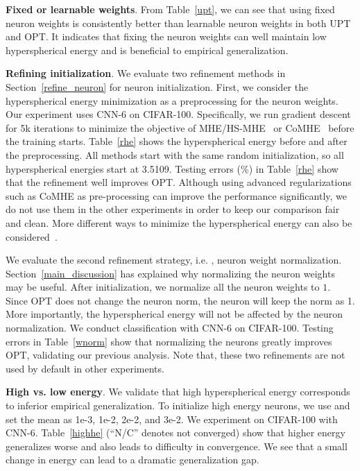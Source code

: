 \textbf{Fixed or learnable weights}. From Table~\ref{upt}, we can see that using fixed neuron weights is consistently better than learnable neuron weights in both UPT and OPT. It indicates that fixing the neuron weights can well maintain low hyperspherical energy and is beneficial to empirical generalization.

\textbf{Refining initialization}. We evaluate two refinement methods in Section~\ref{refine_neuron} for neuron initialization. First, we consider the hyperspherical energy minimization as a preprocessing for the neuron weights. Our experiment uses CNN-6 on CIFAR-100. Specifically, we run gradient descent for 5k iterations to minimize the objective of MHE/HS-MHE~\cite{liu2018learning} or CoMHE~\cite{LinCoMHE20} before the training starts. Table~\ref{rhe} shows the hyperspherical energy before and after the preprocessing. All methods start with the same random initialization, so all hyperspherical energies start at 3.5109. Testing errors (\%) in Table~\ref{rhe} show that the refinement well improves OPT. Although using advanced regularizations such as CoMHE as pre-processing can improve the performance significantly, we do not use them in the other experiments in order to keep our comparison fair and clean. More different ways to minimize the hyperspherical energy can also be considered~\cite{Liu2021SphereUni}.
\par

We evaluate the second refinement strategy, i.e. , neuron weight normalization. Section~\ref{main_discussion} has explained why normalizing the neuron weights may be useful. After initialization, we normalize all the neuron weights to $1$. Since OPT does not change the neuron norm, the neuron will keep the norm as 1. More importantly, the hyperspherical energy will not be affected by the neuron normalization. We conduct classification with CNN-6 on CIFAR-100. Testing errors in Table~\ref{wnorm} show that normalizing the neurons greatly improves OPT, validating our previous analysis. Note that, these two refinements are not used by default in other experiments.

\textbf{High vs. low energy}. We validate that high hyperspherical energy corresponds to inferior empirical generalization. To initialize high energy neurons, we use \cite{he2015delving} and set the mean as 1e-3, 1e-2, 2e-2, and 3e-2. We experiment on CIFAR-100 with CNN-6. Table~\ref{highhe} (``N/C'' denotes not converged) show that higher energy generalizes worse and also leads to difficulty in convergence. We see that a small change in energy can lead to a dramatic generalization gap.

